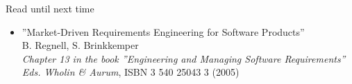 \documentclass{simpleslides}
\begin{document}
\begin{frame}[fragile]{Read until next time}

\begin{itemize}\footnotesize
\item ''Market-Driven Requirements Engineering for Software Products'' \\ B. Regnell, S. Brinkkemper \\ \emph{Chapter 13 in the book ''Engineering and Managing Software Requirements'' Eds. Wholin \& Aurum},  ISBN 3 540 25043 3 (2005)
\end{itemize}

\end{frame}
\end{document}
